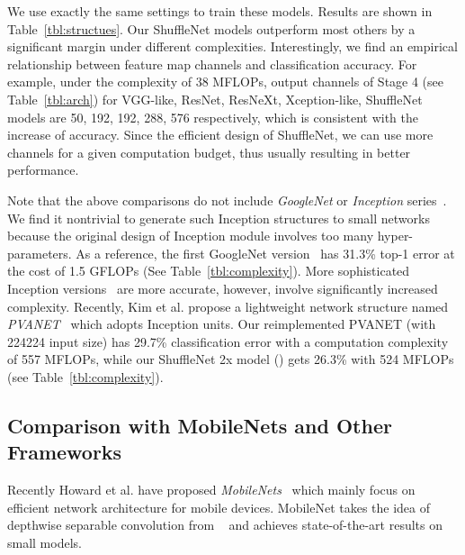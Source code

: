 \documentclass[10pt,twocolumn,letterpaper]{article}
\begin{document}
We use exactly the same settings to train these models. Results are shown in Table~\ref{tbl:structues}. Our ShuffleNet models outperform most others by a significant margin under different complexities. Interestingly, we find an empirical relationship between feature map channels and classification accuracy. For example, under the complexity of 38 MFLOPs, output channels of Stage 4 (see Table~\ref{tbl:arch}) for VGG-like, ResNet, ResNeXt, Xception-like, ShuffleNet models are 50, 192, 192, 288, 576 respectively, which is consistent with the increase of accuracy. Since the efficient design of ShuffleNet, we can use more channels for a given computation budget, thus usually resulting in better performance.



Note that the above comparisons do not include \emph{GoogleNet} or \emph{Inception} series~\cite{szegedy2015going,szegedy2016rethinking,szegedy2016inception}. We find it nontrivial to generate such Inception structures to small networks because the original design of Inception module involves too many hyper-parameters. As a reference, the first GoogleNet version~\cite{szegedy2015going} has 31.3\% top-1 error at the cost of 1.5 GFLOPs (See Table~\ref{tbl:complexity}). More sophisticated Inception versions~\cite{szegedy2016rethinking,szegedy2016inception} are more accurate, however, involve significantly increased complexity. Recently, Kim et al. propose a lightweight network structure named \emph{PVANET}~\cite{kim2016pvanet} which adopts Inception units. Our reimplemented PVANET (with 224224 input size) has 29.7\% classification error with a computation complexity of 557 MFLOPs, while our ShuffleNet 2x model () gets 26.3\% with 524 MFLOPs (see Table~\ref{tbl:complexity}). 
\subsection{Comparison with MobileNets and Other Frameworks}
\label{sec:compmobile}



Recently Howard et al. have proposed \emph{MobileNets}~\cite{howard2017mobilenets} which mainly focus on efficient network architecture for mobile devices. MobileNet takes the idea of depthwise separable convolution from ~\cite{chollet2016xception} and achieves state-of-the-art results on small models.
\end{document}
